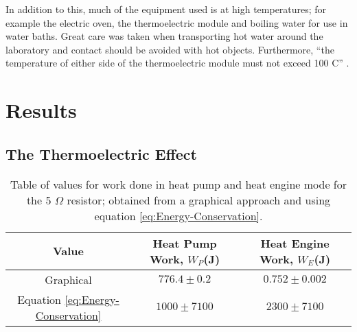 \documentclass{article}
\begin{document}
\vspace{2mm}
\noindent
In addition to this, much of the equipment used is at high temperatures; for example the electric oven, the thermoelectric module and boiling water for use in water baths. Great care was taken when transporting hot water around the laboratory and contact should be avoided with hot objects. Furthermore, ``the temperature of either side of the thermoelectric module must not exceed 100 C'' \cite{Paper01}. 


\section{Results}
\label{sec:results}

\subsection{The Thermoelectric Effect}
\label{ssec:thermo-results}

\vspace{5mm}
\begin{table*}[h]
\centering %
\caption{Table of values for work done in heat pump and heat engine mode for the 5 $\Omega$ resistor; obtained from a graphical approach and using equation \eqref{eq:Energy-Conservation}.}
\label{tab:table1}
\begin{tabular}{|c|c|c|}
\hline
Value & Heat Pump Work, $W_P$(J) & Heat Engine Work, $W_E$(J) \\
\hline
Graphical & $776.4 \pm 0.2$ & $0.752 \pm 0.002$ \\
\hline
Equation \eqref{eq:Energy-Conservation} & $1000 \pm 7100$ & $2300 \pm 7100$ \\
\hline
\end{tabular}
\end{table*}






\end{document}
